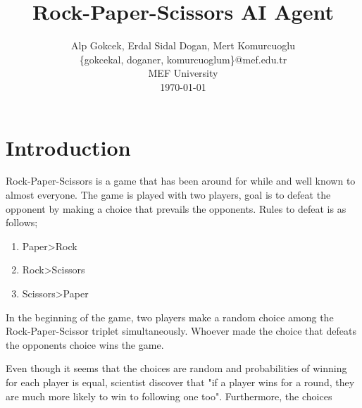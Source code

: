 \documentclass[twocolumns]{IEEEtran}
\author{Alp Gokcek, Erdal Sidal Dogan, Mert Komurcuoglu\\\{gokcekal, doganer, komurcuoglum\}@mef.edu.tr\\ MEF University \\ \today}
\title{Rock-Paper-Scissors AI Agent}
\begin{document}
	\maketitle
\section{Introduction}

Rock-Paper-Scissors is a game that has been around for while and well known to almost everyone. The game is played with two players, goal is to defeat the opponent by making a choice that prevails the opponents. Rules to defeat is as follows;

\begin{enumerate}
	\item Paper\textgreater Rock
	\item Rock\textgreater Scissors	
	\item Scissors\textgreater Paper
\end{enumerate}

In the beginning of the game, two players make a random choice among the Rock-Paper-Scissor triplet simultaneously. Whoever made the choice that defeats the opponents choice wins the game.

Even though it seems that the choices are random and probabilities of winning for each player is equal, scientist discover that "if a player wins for a round, they are much more likely to win to following one too". Furthermore, the choices 
\end{document}
